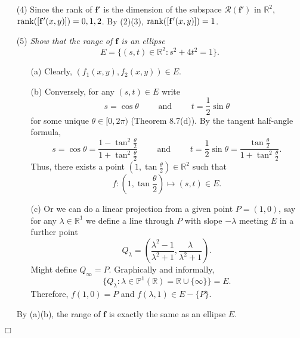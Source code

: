 \documentclass{article}
\begin{document}
\begin{enumerate}
\item[(4)]
  Since the rank of $\mathbf{f}'$ is the dimension of the subspace
  $\mathscr{R}(\mathbf{f}')$ in $\mathbb{R}^2$,
  $\rank([\mathbf{f}'(x,y)]) = 0, 1, 2$.
  By (2)(3), $\rank([\mathbf{f}'(x,y)]) = 1$.

\item[(5)]
  \emph{Show that the range of $\mathbf{f}$ is an ellipse}
  \[
    E = \{ (s,t) \in \mathbb{R}^2 : s^2 + 4t^2 = 1 \}.
  \]
  \begin{enumerate}
  \item[(a)]
    Clearly, $(f_1(x,y), f_2(x,y)) \in E$.

  \item[(b)]
    Conversely, for any $(s,t) \in E$ write
    \[
      s = \cos\theta
      \qquad \text{ and } \qquad
      t = \frac{1}{2} \sin\theta
    \]
    for some unique $\theta \in [0,2\pi)$ (Theorem 8.7(d)).
    By the tangent half-angle formula,
    \[
      s = \cos\theta = \frac{1-\tan^2\frac{\theta}{2}}{1+\tan^2\frac{\theta}{2}}
      \qquad \text{ and } \qquad
      t = \frac{1}{2} \sin\theta = \frac{\tan\frac{\theta}{2}}{1+\tan^2\frac{\theta}{2}}.
    \]
    Thus, there exists a point
    $\left(1, \tan\frac{\theta}{2}\right) \in \mathbb{R}^2$ such that
    \[
      f: \left(1, \tan\frac{\theta}{2}\right)
      \mapsto (s, t) \in E.
    \]

  \item[(c)]
    Or we can do a linear projection from a given point $P = (1,0)$,
    say for any $\lambda \in \mathbb{R}^1$ we define a line through $P$
    with slope $-\lambda$ meeting $E$ in a further point
    \[
      Q_{\lambda}
      = \left(\frac{\lambda^2-1}{\lambda^2+1},
        \frac{\lambda}{\lambda^2+1}\right).
    \]
    Might define $Q_{\infty} = P$.
    Graphically and informally,
    \[
      \{ Q_{\lambda} : \lambda \in \mathbb{P}^1(\mathbb{R}) = \mathbb{R} \cup \{\infty\} \} = E.
    \]
    Therefore, $f(1,0) = P$ and $f(\lambda, 1) \in E-\{P\}$.

  \end{enumerate}
  By (a)(b), the range of $\mathbf{f}$ is exactly the same as an ellipse $E$.

\end{enumerate}
$\Box$ \\\\



\end{document}
